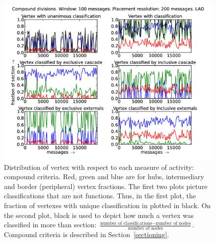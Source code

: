 \documentclass[%
 aip,
 jmp,%
 amsmath,amssymb,
 reprint,%
]{revtex4-1}
\begin{document}
\begin{figure}[hbtp] 
   \centering
        \includegraphics[width=\textwidth]{figs/LAD/100_2}
    \caption{Distribution of vertex with respect to each measure of activity: compound criteria. Red, green and blue are for hubs, intermediary and border (peripheral) vertex fractions. The first two plots picture classifications that are not functions. Thus, in the first plot, the fraction of vertexes with unique classification in plotted in black. On the second plot, black is used to depict how much a vertex was classified in more than section: $\frac{\text{number of classifications} - \text{number of nodes}}{\text{number of nodes}}$. Compound criteria is described in Section~\ref{sectioning}.}
    \label{fig:lad100_}
\end{figure}
\end{document}
